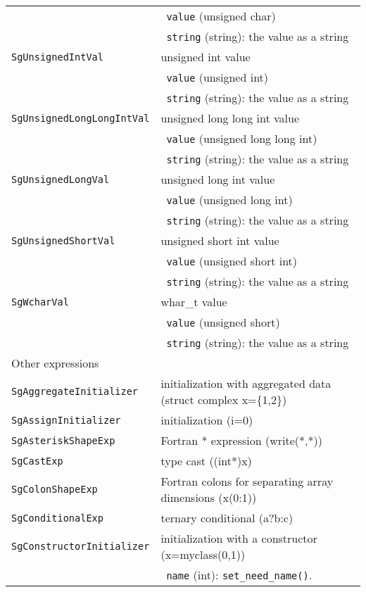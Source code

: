 \begin{longtable}[l]{l|p{10cm}}
 & ~\texttt{value} (unsigned char) \\
 & ~\texttt{string} (string): the value as a string \\
 \texttt{SgUnsignedIntVal}& unsigned int value\\
 & ~\texttt{value} (unsigned int) \\
 & ~\texttt{string} (string): the value as a string \\
 \texttt{SgUnsignedLongLongIntVal}& unsigned long long int value\\
 & ~\texttt{value} (unsigned long long int) \\
 & ~\texttt{string} (string): the value as a string \\
 \texttt{SgUnsignedLongVal}& unsigned long int value\\
 & ~\texttt{value} (unsigned long int) \\
 & ~\texttt{string} (string): the value as a string \\
 \texttt{SgUnsignedShortVal}& unsigned short int value\\
 & ~\texttt{value} (unsigned short int) \\
 & ~\texttt{string} (string): the value as a string \\
 \texttt{SgWcharVal}& whar\_t value\\
 & ~\texttt{value} (unsigned short) \\
 & ~\texttt{string} (string): the value as a string \\
 \hline
 \multicolumn{2}{l}{Other expressions}\\
 \hline
 \texttt{SgAggregateInitializer} & initialization with aggregated data (struct complex x=\{1,2\}) \\
 \texttt{SgAssignInitializer} & initialization (i=0)\\
 \texttt{SgAsteriskShapeExp} & Fortran * expression (write(*,*))\\
 \texttt{SgCastExp} & type cast ((int*)x)\\
 \texttt{SgColonShapeExp} & Fortran colons for separating array dimensions (x(0:1))\\
 \texttt{SgConditionalExp} & ternary conditional (a?b:c)\\
 \texttt{SgConstructorInitializer} & initialization with a constructor (x=myclass(0,1))\\
 & ~\texttt{name} (int): \texttt{set\_need\_name()}. \\

\end{longtable}
